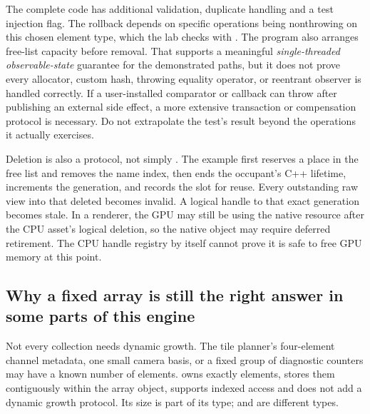 The complete code has additional validation, duplicate handling and a test injection flag. The rollback depends on specific operations being nonthrowing on this chosen element type, which the lab checks with . The program also arranges free-list capacity before removal. That supports a meaningful \emph{single-threaded observable-state} guarantee for the demonstrated paths, but it does not prove every allocator, custom hash, throwing equality operator, or reentrant observer is handled correctly. If a user-installed comparator or callback can throw after publishing an external side effect, a more extensive transaction or compensation protocol is necessary. Do not extrapolate the test's result beyond the operations it actually exercises.

Deletion is also a protocol, not simply . The example first reserves a place in the free list and removes the name index, then ends the occupant's C++ lifetime, increments the generation, and records the slot for reuse. Every outstanding raw view into that deleted  becomes invalid. A logical handle to that exact generation becomes stale. In a renderer, the GPU may still be using the native resource after the CPU asset's logical deletion, so the native object may require deferred retirement. The CPU handle registry by itself cannot prove it is safe to free GPU memory at this point.

\subsection{Why a fixed array is still the right answer in some parts of this engine}\label{05-engine-i-ch005-why-a-fixed-array-is-still-the-right-answer-in-some-parts-of-this-engine}

\hypertarget{05-engine-i-ch005-why-a-fixed-array-is-still-the-right-answer-in-some-parts-of-this-engine}{}

Not every collection needs dynamic growth. The tile planner's four-element channel metadata, one small camera basis, or a fixed group of diagnostic counters may have a known number of elements.  owns exactly  elements, stores them contiguously within the array object, supports indexed access and does not add a dynamic growth protocol. Its size is part of its type;  and  are different types.

